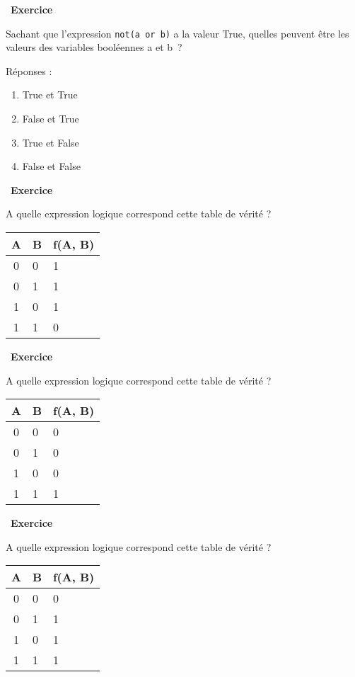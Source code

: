 \documentclass[
  11pt,
]{article}
\newcommand{\passthrough}[1]{#1}
\providecommand{\tightlist}{%
  \setlength{\itemsep}{0pt}\setlength{\parskip}{0pt}}
\newcounter{exo}
\newenvironment{exercice}[1]
{\par \medskip   \addtocounter{exo}{1} \noindent  
\begin{bclogo}[arrondi =0.1,   noborder = true, logo=\bccrayon, marge=4]{~\textbf{Exercice} \textbf{\theexo} {\itshape #1} }  \par}
{
\end{bclogo}
 \par \bigskip }
\newcounter{def}
\newcounter{logi}
\begin{document}
\begin{exercice}{}

Sachant que l'expression \passthrough{\lstinline!not(a or b)!} a la
valeur True, quelles peuvent être les valeurs des variables booléennes a
et b~?

Réponses :

\begin{enumerate}
\def\labelenumi{\arabic{enumi}.}
\tightlist
\item
  True et True
\item
  False et True
\item
  True et False
\item
  False et False
\end{enumerate}

\end{exercice}

\begin{exercice}{}

A quelle expression logique correspond cette table de vérité ?

\begin{longtable}[]{@{}cll@{}}
\toprule
A & B & f(A, B)\tabularnewline
\midrule
\endhead
0 & 0 & 1\tabularnewline
0 & 1 & 1\tabularnewline
1 & 0 & 1\tabularnewline
1 & 1 & 0\tabularnewline
\bottomrule
\end{longtable}

\end{exercice}

\begin{exercice}{}

A quelle expression logique correspond cette table de vérité ?

\begin{longtable}[]{@{}cll@{}}
\toprule
A & B & f(A, B)\tabularnewline
\midrule
\endhead
0 & 0 & 0\tabularnewline
0 & 1 & 0\tabularnewline
1 & 0 & 0\tabularnewline
1 & 1 & 1\tabularnewline
\bottomrule
\end{longtable}

\end{exercice}

\begin{exercice}{}

A quelle expression logique correspond cette table de vérité ?

\begin{longtable}[]{@{}cll@{}}
\toprule
A & B & f(A, B)\tabularnewline
\midrule
\endhead
0 & 0 & 0\tabularnewline
0 & 1 & 1\tabularnewline
1 & 0 & 1\tabularnewline
1 & 1 & 1\tabularnewline
\bottomrule
\end{longtable}

\end{exercice}
\end{document}
